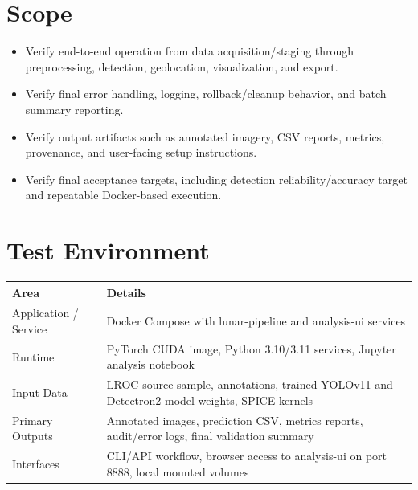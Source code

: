\documentclass[11pt,landscape]{article}
\begin{document}
\section*{Scope}
\begin{itemize}[leftmargin=*]
\item Verify end-to-end operation from data acquisition/staging through preprocessing, detection, geolocation, visualization, and export.
\item Verify final error handling, logging, rollback/cleanup behavior, and batch summary reporting.
\item Verify output artifacts such as annotated imagery, CSV reports, metrics, provenance, and user-facing setup instructions.
\item Verify final acceptance targets, including detection reliability/accuracy target and repeatable Docker-based execution.
\end{itemize}
\section*{Test Environment}
\begin{longtable}{p{2.0in}p{7.6in}}\toprule\textbf{Area} & \textbf{Details}\\\midrule\endhead
Application / Service & Docker Compose with lunar-pipeline and analysis-ui services \\
Runtime & PyTorch CUDA image, Python 3.10/3.11 services, Jupyter analysis notebook \\
Input Data & LROC source sample, annotations, trained YOLOv11 and Detectron2 model weights, SPICE kernels \\
Primary Outputs & Annotated images, prediction CSV, metrics reports, audit/error logs, final validation summary \\
Interfaces & CLI/API workflow, browser access to analysis-ui on port 8888, local mounted volumes \\
\bottomrule\end{longtable}
\end{document}
